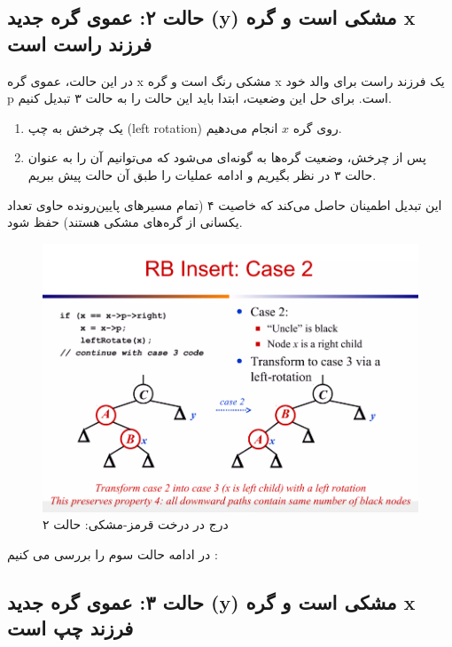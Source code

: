 \documentclass[a4paper,12pt]{article}
\begin{document}
			\subsection*{حالت ۲: عموی گره جدید (y) مشکی است و گره x فرزند راست است}
									
									در این حالت، عموی گره x مشکی رنگ است و گره x یک فرزند راست برای والد خود p است. برای حل این وضعیت، ابتدا باید این حالت را به حالت ۳ تبدیل کنیم.
									
									\begin{enumerate}
										\item یک چرخش به چپ (left rotation) روی گره $x$ انجام می‌دهیم.
										\item پس از چرخش، وضعیت گره‌ها به گونه‌ای می‌شود که می‌توانیم آن را به عنوان حالت ۳ در نظر بگیریم و ادامه عملیات را طبق آن حالت پیش ببریم.
									\end{enumerate}
									
									این تبدیل اطمینان حاصل می‌کند که خاصیت ۴ (تمام مسیرهای پایین‌رونده حاوی تعداد یکسانی از گره‌های مشکی هستند) حفظ شود.
									
									\begin{figure}[H]
										\centering
										\includegraphics[width=1.1\textwidth]{img/insert-case2.png} %
										\caption{درج در درخت قرمز-مشکی: حالت ۲}
									\end{figure}
									
									\vspace{10pt}
									
در ادامه حالت سوم را بررسی می کنیم :
			\subsection*{حالت ۳: عموی گره جدید (y) مشکی است و گره x فرزند چپ است}
							
\end{document}
